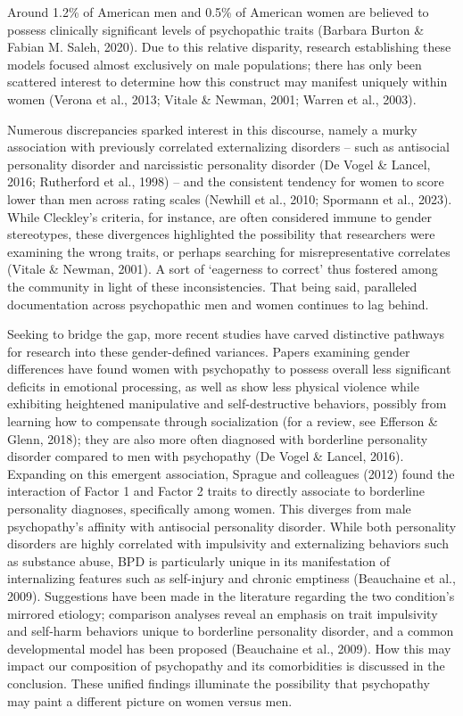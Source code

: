 \documentclass[
  man,floatsintext]{apa7}
\begin{document}
Around 1.2\% of American men and 0.5\% of American women are believed to possess clinically significant levels of psychopathic traits (Barbara Burton \& Fabian M. Saleh, 2020). Due to this relative disparity, research establishing these models focused almost exclusively on male populations; there has only been scattered interest to determine how this construct may manifest uniquely within women (Verona et al., 2013; Vitale \& Newman, 2001; Warren et al., 2003).

Numerous discrepancies sparked interest in this discourse, namely a murky association with previously correlated externalizing disorders -- such as antisocial personality disorder and narcissistic personality disorder (De Vogel \& Lancel, 2016; Rutherford et al., 1998) -- and the consistent tendency for women to score lower than men across rating scales (Newhill et al., 2010; Spormann et al., 2023). While Cleckley's criteria, for instance, are often considered immune to gender stereotypes, these divergences highlighted the possibility that researchers were examining the wrong traits, or perhaps searching for misrepresentative correlates (Vitale \& Newman, 2001). A sort of `eagerness to correct' thus fostered among the community in light of these inconsistencies. That being said, paralleled documentation across psychopathic men and women continues to lag behind.

Seeking to bridge the gap, more recent studies have carved distinctive pathways for research into these gender-defined variances. Papers examining gender differences have found women with psychopathy to possess overall less significant deficits in emotional processing, as well as show less physical violence while exhibiting heightened manipulative and self-destructive behaviors, possibly from learning how to compensate through socialization (for a review, see Efferson \& Glenn, 2018); they are also more often diagnosed with borderline personality disorder compared to men with psychopathy (De Vogel \& Lancel, 2016). Expanding on this emergent association, Sprague and colleagues (2012) found the interaction of Factor 1 and Factor 2 traits to directly associate to borderline personality diagnoses, specifically among women. This diverges from male psychopathy's affinity with antisocial personality disorder. While both personality disorders are highly correlated with impulsivity and externalizing behaviors such as substance abuse, BPD is particularly unique in its manifestation of internalizing features such as self-injury and chronic emptiness (Beauchaine et al., 2009). Suggestions have been made in the literature regarding the two condition's mirrored etiology; comparison analyses reveal an emphasis on trait impulsivity and self-harm behaviors unique to borderline personality disorder, and a common developmental model has been proposed (Beauchaine et al., 2009). How this may impact our composition of psychopathy and its comorbidities is discussed in the conclusion. These unified findings illuminate the possibility that psychopathy may paint a different picture on women versus men.
\end{document}
